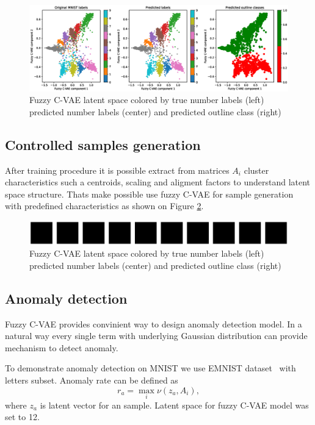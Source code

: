 \documentclass[runningheads]{llncs}
\begin{document}
\begin{figure}[h]  
    \centering
    \includegraphics[width=1\textwidth]{fig3-fcvae-classification.eps}
    \caption{Fuzzy C-VAE latent space colored by true number labels (left) predicted number labels (center) and predicted outline class (right) }
    \label{fig:fcvae-classes}
\end{figure}

\subsection{Controlled samples generation}

After training procedure it is possible extract from matrices $A_i$ cluster characteristics such a centroids, scaling and aligment factors to understand latent space structure.
Thats make possible use fuzzy C-VAE for sample generation with predefined characteristics as shown on Figure \ref{fig:samples-generation}.

\begin{figure}[h]  
    \centering
    \includegraphics[width=1\textwidth]{fig4-sample-generation.eps}
    \caption{Fuzzy C-VAE latent space colored by true number labels (left) predicted number labels (center) and predicted outline class (right) }
    \label{fig:samples-generation}
\end{figure}

\subsection{Anomaly detection}

Fuzzy C-VAE provides convinient way to design anomaly detection model.
In a natural way every single term with underlying Gaussian distribution can provide mechanism to detect anomaly. 

To demonstrate anomaly detection on MNIST we use EMNIST dataset~\cite{cohenafshartapsonschaik2017} with letters subset.
Anomaly rate can be defined as 
\[
    r_{a} = \max_i \nu(z_{a}, A_i),
\] 
where $z_{a}$ is latent vector for an sample.
Latent space for fuzzy C-VAE model was set to 12.
\end{document}
